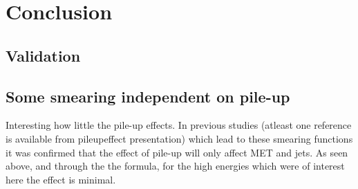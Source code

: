 \section{Conclusion}
\subsection{Validation}
\subsection{Some smearing independent on pile-up}
Interesting how little the pile-up effects. In previous studies (atleast one reference is available from pileupeffect presentation) which lead to these smearing functions it was confirmed that the effect of pile-up will only affect MET and jets. As seen above, and through the the formula, for the high energies which were of interest here the effect is minimal. 

